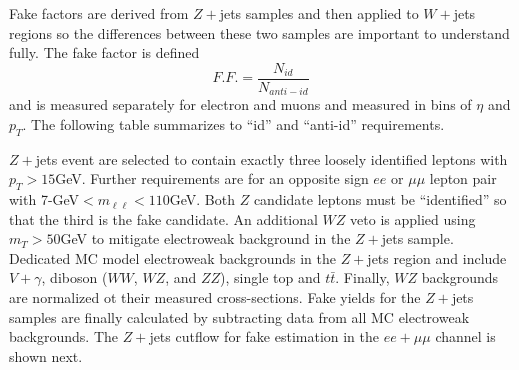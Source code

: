 Fake factors are derived from $Z+$jets samples and then applied to $W+$jets regions so the differences between these two samples are important to understand fully. The fake factor is defined 
\begin{equation}
F.F. = \frac{N_{id}}{N_{anti-id}}
\end{equation}
and is measured separately for electron and muons and measured in bins of $\eta$ and $p_T$. The following table summarizes to ``id'' and ``anti-id'' requirements. 

\begin{table}[tb]
\caption{Requirements for ``identified'' and ``anti-identified'' electrons and muons.}
\label{tab:idantiid}
\end{table}
$Z+$jets event are selected to contain exactly three loosely identified leptons with $p_T>15$GeV. Further requirements are for an opposite sign $ee$ or $\mu\mu$ lepton pair with 7-GeV$< m_{\ell\ell} < 110$GeV. Both $Z$ candidate leptons must be ``identified'' so that the third is the fake candidate. An additional $WZ$ veto is applied using $m_T>50$GeV to mitigate electroweak background in the $Z+$jets sample. Dedicated MC model electroweak backgrounds in the $Z+$jets region and include $V+\gamma$, diboson ($WW$, $WZ$, and $ZZ$), single top and $t\bar{t}$. Finally, $WZ$ backgrounds are normalized ot their measured cross-sections. Fake yields for the $Z+$jets samples are finally calculated by subtracting data from all MC electroweak backgrounds. The $Z+$jets cutflow for fake estimation in the $ee+\mu\mu$ channel is shown next. 

